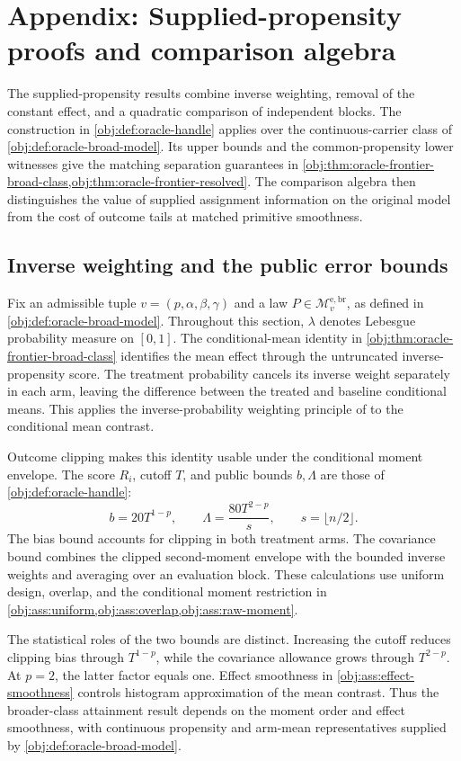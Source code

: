 \section{Appendix: Supplied-propensity proofs and comparison algebra}

The supplied-propensity results combine inverse weighting, removal of the constant effect, and a quadratic comparison of independent blocks. The construction in \cref{obj:def:oracle-handle} applies over the continuous-carrier class of \cref{obj:def:oracle-broad-model}. Its upper bounds and the common-propensity lower witnesses give the matching separation guarantees in \cref{obj:thm:oracle-frontier-broad-class,obj:thm:oracle-frontier-resolved}. The comparison algebra then distinguishes the value of supplied assignment information on the original model from the cost of outcome tails at matched primitive smoothness.

\subsection{Inverse weighting and the public error bounds}

Fix an admissible tuple \(v=(p,\alpha,\beta,\gamma)\) and a law \(P\in\mathcal M_v^{\mathrm{e,br}}\), as defined in \cref{obj:def:oracle-broad-model}. Throughout this section, \(\lambda\) denotes Lebesgue probability measure on \([0,1]\). The conditional-mean identity in \cref{obj:thm:oracle-frontier-broad-class} identifies the mean effect through the untruncated inverse-propensity score. The treatment probability cancels its inverse weight separately in each arm, leaving the difference between the treated and baseline conditional means. This applies the inverse-probability weighting principle of \citet[pp.~665--666]{Horvitz1952} to the conditional mean contrast.

Outcome clipping makes this identity usable under the conditional moment envelope. The score \(R_i\), cutoff \(T\), and public bounds \(b,\Lambda\) are those of \cref{obj:def:oracle-handle}:
\[
b=20T^{1-p},
\qquad
\Lambda=\frac{80T^{2-p}}{s},
\qquad
s=\lfloor n/2\rfloor.
\]
The bias bound accounts for clipping in both treatment arms. The covariance bound combines the clipped second-moment envelope with the bounded inverse weights and averaging over an evaluation block. These calculations use uniform design, overlap, and the conditional moment restriction in
\cref{obj:ass:uniform,obj:ass:overlap,obj:ass:raw-moment}.

The statistical roles of the two bounds are distinct. Increasing the cutoff reduces clipping bias through \(T^{1-p}\), while the covariance allowance grows through \(T^{2-p}\). At \(p=2\), the latter factor equals one. Effect smoothness in \cref{obj:ass:effect-smoothness} controls histogram approximation of the mean contrast. Thus the broader-class attainment result depends on the moment order and effect smoothness, with continuous propensity and arm-mean representatives supplied by \cref{obj:def:oracle-broad-model}.

